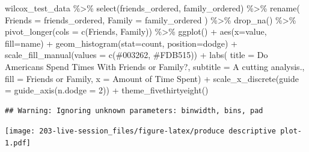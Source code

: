 \documentclass[
]{book}
\newenvironment{Shaded}{\begin{snugshade}}{\end{snugshade}}
\newcommand{\AttributeTok}[1]{\textcolor[rgb]{0.77,0.63,0.00}{#1}}
\newcommand{\DecValTok}[1]{\textcolor[rgb]{0.00,0.00,0.81}{#1}}
\newcommand{\FunctionTok}[1]{\textcolor[rgb]{0.00,0.00,0.00}{#1}}
\newcommand{\NormalTok}[1]{#1}
\newcommand{\SpecialCharTok}[1]{\textcolor[rgb]{0.00,0.00,0.00}{#1}}
\newcommand{\StringTok}[1]{\textcolor[rgb]{0.31,0.60,0.02}{#1}}
\theoremstyle{definition}
\theoremstyle{definition}
\theoremstyle{definition}
\theoremstyle{definition}
\theoremstyle{remark}
\begin{document}
\begin{Shaded}
\begin{Highlighting}[]
\NormalTok{wilcox\_test\_data }\SpecialCharTok{\%\textgreater{}\%} 
  \FunctionTok{select}\NormalTok{(friends\_ordered, family\_ordered) }\SpecialCharTok{\%\textgreater{}\%} 
  \FunctionTok{rename}\NormalTok{(}
    \AttributeTok{Friends =}\NormalTok{ friends\_ordered, }
    \AttributeTok{Family  =}\NormalTok{ family\_ordered}
\NormalTok{  ) }\SpecialCharTok{\%\textgreater{}\%} 
  \FunctionTok{drop\_na}\NormalTok{() }\SpecialCharTok{\%\textgreater{}\%} 
  \FunctionTok{pivot\_longer}\NormalTok{(}\AttributeTok{cols =} \FunctionTok{c}\NormalTok{(Friends, Family)) }\SpecialCharTok{\%\textgreater{}\%}   
  \FunctionTok{ggplot}\NormalTok{() }\SpecialCharTok{+} 
    \FunctionTok{aes}\NormalTok{(}\AttributeTok{x=}\NormalTok{value, }\AttributeTok{fill=}\NormalTok{name) }\SpecialCharTok{+} 
    \FunctionTok{geom\_histogram}\NormalTok{(}\AttributeTok{stat=}\StringTok{\textquotesingle{}count\textquotesingle{}}\NormalTok{, }\AttributeTok{position=}\StringTok{\textquotesingle{}dodge\textquotesingle{}}\NormalTok{) }\SpecialCharTok{+} 
  \FunctionTok{scale\_fill\_manual}\NormalTok{(}\AttributeTok{values =} \FunctionTok{c}\NormalTok{(}\StringTok{\textquotesingle{}\#003262\textquotesingle{}}\NormalTok{, }\StringTok{\textquotesingle{}\#FDB515\textquotesingle{}}\NormalTok{)) }\SpecialCharTok{+} 
  \FunctionTok{labs}\NormalTok{(}
    \AttributeTok{title =} \StringTok{\textquotesingle{}Do Americans Spend Times With Friends or Family?\textquotesingle{}}\NormalTok{,}
    \AttributeTok{subtitle =} \StringTok{\textquotesingle{}A cutting analysis.\textquotesingle{}}\NormalTok{, }
    \AttributeTok{fill =} \StringTok{\textquotesingle{}Friends or Family\textquotesingle{}}\NormalTok{, }
    \AttributeTok{x =} \StringTok{\textquotesingle{}Amount of Time Spent\textquotesingle{}}\NormalTok{) }\SpecialCharTok{+} 
  \FunctionTok{scale\_x\_discrete}\NormalTok{(}\AttributeTok{guide =} \FunctionTok{guide\_axis}\NormalTok{(}\AttributeTok{n.dodge =} \DecValTok{2}\NormalTok{)) }\SpecialCharTok{+}
  \FunctionTok{theme\_fivethirtyeight}\NormalTok{()}
\end{Highlighting}
\end{Shaded}

\begin{verbatim}
## Warning: Ignoring unknown parameters: binwidth, bins, pad
\end{verbatim}

\texttt{[image: 203-live-session\_files/figure-latex/produce descriptive plot-1.pdf]}
\end{document}
